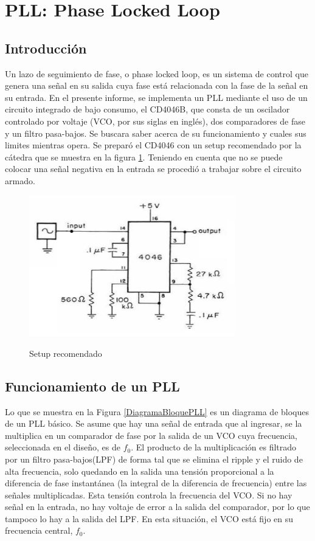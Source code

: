 \section{PLL: Phase Locked Loop}

\subsection{Introducción}

Un lazo de seguimiento de fase, o phase locked loop, es un sistema de control que genera una señal en su salida cuya fase está relacionada con la fase de la señal en su entrada. En el presente informe, se implementa un PLL mediante el uso de un circuito integrado de bajo consumo, el CD4046B, que consta de un oscilador controlado por voltaje (VCO, por sus siglas en inglés), dos comparadores de fase y un filtro pasa-bajos. Se buscara saber acerca de su funcionamiento y cuales sus limites mientras opera. 
Se preparó el CD4046 con un setup recomendado por la cátedra que se muestra en la figura \ref{fig:Circuito PLL}. Teniendo en cuenta que no se puede colocar una señal negativa en la entrada se procedió a trabajar sobre el circuito armado.

\begin{figure}[h!]
	\centering
	\includegraphics[width= 0.8\textwidth]{../1. PLL/Imagenes/Circuito PLL.png} 
	\label{fig:Circuito PLL}
	\caption{Setup recomendado}
\end{figure}

\subsection{Funcionamiento de un PLL}

Lo que se muestra en la Figura \ref{DiagramaBloquePLL} es un diagrama de bloques de un PLL básico. Se asume que hay una señal de entrada que al ingresar, se la multiplica en un comparador de fase por la salida de un VCO cuya frecuencia, seleccionada en el diseño, es de $f_0$. El producto de la multiplicación es filtrado por un filtro pasa-bajos(LPF) de forma tal que se elimina el ripple y el ruido de alta frecuencia, solo quedando en la salida una tensión proporcional a la diferencia de fase instantánea (la integral de la diferencia de frecuencia) entre las señales multiplicadas. Esta tensión controla la frecuencia del VCO. Si no hay señal en la entrada, no hay voltaje de error a la salida del comparador, por lo que tampoco lo hay a la salida del LPF. En esta situación, el VCO está fijo en su frecuencia central, $f_0$.


